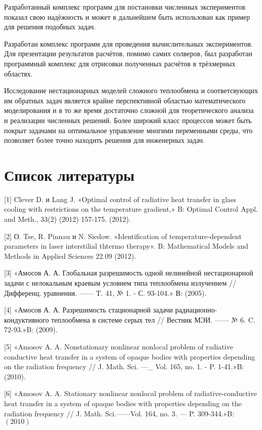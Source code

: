 \documentclass[10pt]{article}
\begin{document}
Разработанный комплекс программ для постановки численных экспериментов показал свою надёжность и может в дальнейшем быть использован как пример для решения подобных задач.

Разработан комплекс программ для проведения вычислительных экспериментов. Для презентации результатов расчётов, помимо самих солверов, был разработан программный комплекс для отрисовки полученных расчётов в трёхмерных областях.

Исследование нестационарных моделей сложного теплообмена и соответсвующих им обратных задач является крайне перспективной областью математического моделирования и в то же время достаточно сложной для теоретического анализа и реализации численных решений. Более широкий класс процессов может быть покрыт задачами на оптимальное управление многими переменными среды, что позволяет более точно находить решения для инженерных задач.

\section{Список литературы}
[1] Clever D. и Lang J. «Optimal control of radiative heat transfer in glass cooling with restrictions on the temperature gradient,» B: Optimal Control Appl. and Meth., 33(2) (2012) 157-175. (2012).

[2] О. Tse, R. Pinnau и N. Siedow. «Identification of temperature-dependent parameters in laser interstilial thtermo therapy». B: Mathematical Models and Methods in Applied Sciences $22.09$ (2012).

[3] «Амосов А. А. Глобальная разрешимость одной нелинейной нестационарной задачи с нелокальным краевым условием типа теплообмена излучением // Дифференц. уравнения. —— T. 41, № 1. - С. 93-104.» В: (2005).

[4] «Амосов А. А. Разрешимость стационарной задачи радиационно-кондуктивного теплообмена в системе серых тел // Вестник МЭИ. —— № 6. C. 72-93.»B: (2009).

[5] «Amosov A. A. Nonstationary nonlinear nonlocal problem of radiative conductive heat transfer in a system of opaque bodies with properties depending on the radiation frequency // J. Math. Sci. —\_ Vol. 165, no. 1. - P. 1-41.»B: (2010).

[6] «Amosov A. A. Stationary nonlinear nonlocal problem of radiative-conductive heat transfer in a system of opaque bodies with properties depending on the radiation frequency // J. Math. Sci.——Vol. 164, no. 3. — P. 309-344.»B: $(2010)$
\end{document}
